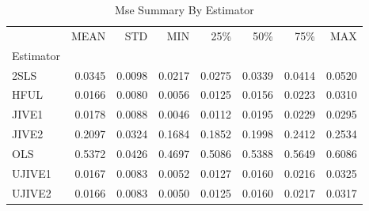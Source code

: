 \begin{table}[ht]
\centering
\caption{Mse Summary By Estimator}
\begin{tabular}{lrrrrrrr}
\toprule
 & MEAN & STD & MIN & 25\% & 50\% & 75\% & MAX \\
Estimator &  &  &  &  &  &  &  \\
\midrule
2SLS & 0.0345 & 0.0098 & 0.0217 & 0.0275 & 0.0339 & 0.0414 & 0.0520 \\
HFUL & 0.0166 & 0.0080 & 0.0056 & 0.0125 & 0.0156 & 0.0223 & 0.0310 \\
JIVE1 & 0.0178 & 0.0088 & 0.0046 & 0.0112 & 0.0195 & 0.0229 & 0.0295 \\
JIVE2 & 0.2097 & 0.0324 & 0.1684 & 0.1852 & 0.1998 & 0.2412 & 0.2534 \\
OLS & 0.5372 & 0.0426 & 0.4697 & 0.5086 & 0.5388 & 0.5649 & 0.6086 \\
UJIVE1 & 0.0167 & 0.0083 & 0.0052 & 0.0127 & 0.0160 & 0.0216 & 0.0325 \\
UJIVE2 & 0.0166 & 0.0083 & 0.0050 & 0.0125 & 0.0160 & 0.0217 & 0.0317 \\
\bottomrule
\end{tabular}
\end{table}
